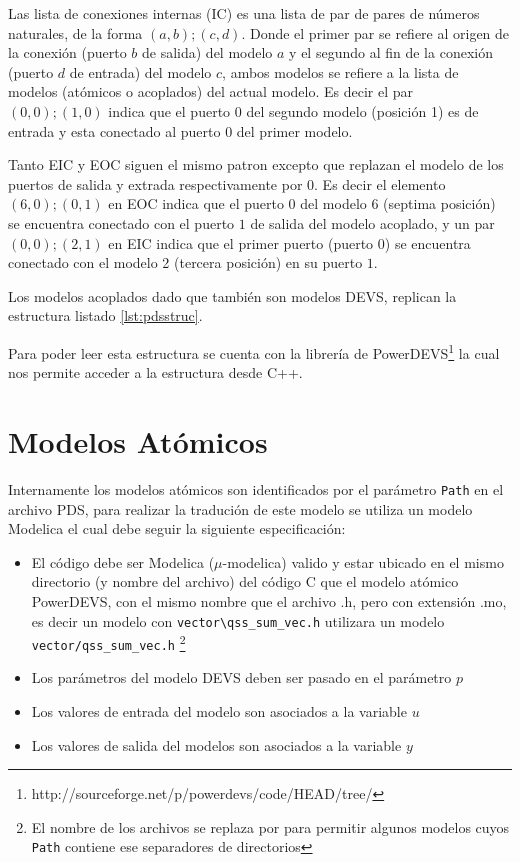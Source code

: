 	Las lista de conexiones internas (IC) es una lista de par de pares de números naturales, de la forma $(a,b);(c,d)$.
	Donde el primer par se refiere al origen de la conexión (puerto $b$ de salida) del modelo $a$ y el segundo al fin de la conexión (puerto $d$ de entrada) 
	del modelo $c$, ambos modelos se refiere a la lista de modelos (atómicos o acoplados) del actual modelo.
	Es decir el par $(0,0);(1,0)$ indica que el puerto $0$ del segundo modelo (posición 1) es de entrada  y esta conectado al puerto $0$ del primer modelo.

	Tanto EIC y EOC siguen el mismo patron excepto que replazan el modelo de los puertos de salida y extrada respectivamente por $0$. Es decir el elemento 
	$(6,0);(0,1)$ en EOC indica que el puerto $0$ del modelo $6$ (septima posición)  se encuentra conectado con el puerto $1$ de salida del modelo 
	acoplado, y un par $(0,0);(2,1)$ en EIC indica que el primer puerto (puerto $0$) se encuentra conectado con el modelo 2 (tercera posición) en su puerto $1$.

        Los modelos acoplados dado que también son modelos DEVS, replican la estructura listado \ref{lst:pdsstruc}.

        Para poder leer esta estructura se cuenta con la librería de PowerDEVS\footnote{http://sourceforge.net/p/powerdevs/code/HEAD/tree/} la cual nos permite acceder
        a la estructura desde C++. 

\section{Modelos Atómicos}
	
	Internamente los modelos atómicos son identificados por el parámetro \texttt{Path} en el archivo PDS, para realizar la tradución de este modelo se utiliza 
	un modelo Modelica el cual debe seguir la siguiente especificación:

\begin{itemize}
	\item El código debe ser Modelica ($\mu$-modelica) valido y estar ubicado en el mismo directorio (y nombre del archivo) del código C que el modelo atómico 
	PowerDEVS, con el mismo nombre que el archivo .h, pero con extensión .mo, es decir un modelo con \texttt{vector\textbackslash qss\_sum\_vec.h} utilizara un modelo 
	\texttt{vector/qss\_sum\_vec.h} \footnote{El nombre de los archivos se replaza \quotes{\textbackslash} por \quotes{/} para permitir algunos modelos 
	cuyos \texttt{Path} contiene ese separadores de directorios}
	\item Los parámetros del modelo DEVS deben ser pasado en el parámetro $p$
	\item Los valores de entrada del modelo son asociados a la variable $u$
	\item Los valores de salida del modelos son asociados a la variable $y$
\end{itemize}

